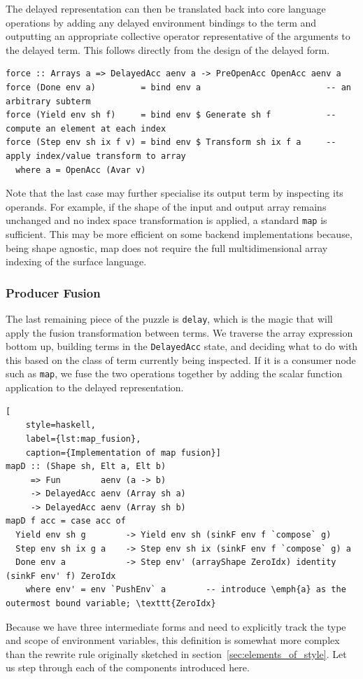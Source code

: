 The delayed representation can then be translated back into core language
operations by adding any delayed environment bindings to the term and outputting
an appropriate collective operator representative of the arguments to the
delayed term. This follows directly from the design of the delayed form.
%
\begin{lstlisting}[style=haskell]
force :: Arrays a => DelayedAcc aenv a -> PreOpenAcc OpenAcc aenv a
force (Done env a)         = bind env a                         -- an arbitrary subterm
force (Yield env sh f)     = bind env $ Generate sh f           -- compute an element at each index
force (Step env sh ix f v) = bind env $ Transform sh ix f a     -- apply index/value transform to array
  where a = OpenAcc (Avar v)
\end{lstlisting}
%
Note that the last case may further specialise its output term by inspecting its
operands. For example, if the shape of the input and output array remains
unchanged and no index space transformation is applied, a standard \texttt{map}
is sufficient. This may be more efficient on some backend implementations
because, being shape agnostic, map does not require the full multidimensional
array indexing of the surface language.

\subsubsection{Producer Fusion}

The last remaining piece of the puzzle is \texttt{delay}, which is the magic
that will apply the fusion transformation between terms. We traverse the array
expression bottom up, building terms in the \texttt{DelayedAcc} state, and
deciding what to do with this based on the class of term currently being
inspected. If it is a consumer node such as \texttt{map}, we fuse the two
operations together by adding the scalar function application to the delayed
representation.
%
\begin{lstlisting}[
    style=haskell,
    label={lst:map_fusion},
    caption={Implementation of map fusion}]
mapD :: (Shape sh, Elt a, Elt b)
     => Fun        aenv (a -> b)
     -> DelayedAcc aenv (Array sh a)
     -> DelayedAcc aenv (Array sh b)
mapD f acc = case acc of
  Yield env sh g        -> Yield env sh (sinkF env f `compose` g)
  Step env sh ix g a    -> Step env sh ix (sinkF env f `compose` g) a
  Done env a            -> Step env' (arrayShape ZeroIdx) identity (sinkF env' f) ZeroIdx
    where env' = env `PushEnv` a        -- introduce \emph{a} as the outermost bound variable; \texttt{ZeroIdx}
\end{lstlisting}
%
Because we have three intermediate forms and need to explicitly track the type
and scope of environment variables, this definition is somewhat more complex
than the rewrite rule originally sketched in
section~\ref{sec:elements_of_style}. Let us step through each of the components
introduced here.


